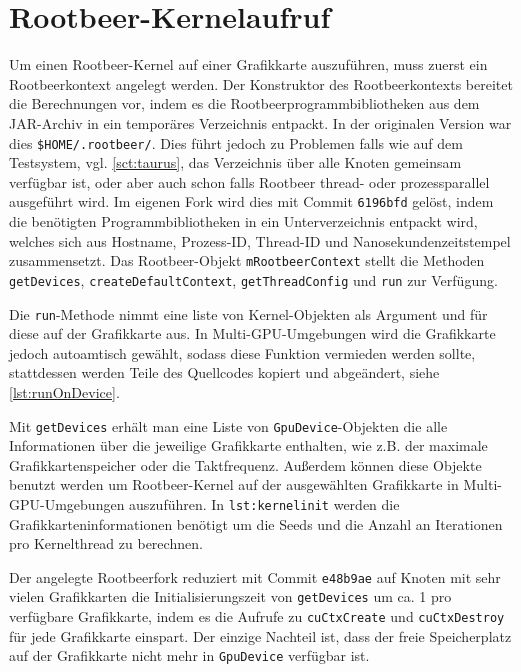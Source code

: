 \section{Rootbeer-Kernelaufruf}

Um einen Rootbeer-Kernel auf einer Grafikkarte auszuführen, muss zuerst ein Rootbeerkontext angelegt werden.
Der Konstruktor des Rootbeerkontexts bereitet die Berechnungen vor, indem es die Rootbeerprogrammbibliotheken aus dem JAR-Archiv in ein temporäres Verzeichnis entpackt. In der originalen Version war dies \lstinline!$HOME/.rootbeer/!.
Dies führt jedoch zu Problemen falls wie auf dem Testsystem, vgl. \autoref{sct:taurus}, das Verzeichnis über alle Knoten gemeinsam verfügbar ist, oder aber auch schon falls Rootbeer thread- oder prozessparallel ausgeführt wird.
Im eigenen Fork \cite{ownrootbeerfork} wird dies mit Commit \lstinline!6196bfd! gelöst, indem die benötigten Programmbibliotheken in ein Unterverzeichnis entpackt wird, welches sich aus Hostname, Prozess-ID, Thread-ID und Nanosekundenzeitstempel zusammensetzt.
Das Rootbeer-Objekt \lstinline!mRootbeerContext! stellt die Methoden \lstinline!getDevices!, \lstinline!createDefaultContext!, \lstinline!getThreadConfig! und \lstinline!run! zur Verfügung.

Die \lstinline!run!-Methode nimmt eine liste von Kernel-Objekten als Argument und für diese auf der Grafikkarte aus. In Multi-GPU-Umgebungen wird die Grafikkarte jedoch autoamtisch gewählt, sodass diese Funktion vermieden werden sollte, stattdessen werden Teile des Quellcodes kopiert und abgeändert, siehe \autoref{lst:runOnDevice}.

Mit \lstinline!getDevices! erhält man eine Liste von \lstinline!GpuDevice!-Objekten die alle Informationen über die jeweilige Grafikkarte enthalten, wie z.B. der maximale Grafikkartenspeicher oder die Taktfrequenz. Außerdem können diese Objekte benutzt werden um Rootbeer-Kernel auf der ausgewählten Grafikkarte in Multi-GPU-Umgebungen auszuführen. In \lstinline!lst:kernelinit! werden die Grafikkarteninformationen benötigt um die Seeds und die Anzahl an Iterationen pro Kernelthread zu berechnen.

Der angelegte Rootbeerfork \cite{ownrootbeerfork} reduziert mit Commit \lstinline!e48b9ae! auf Knoten mit sehr vielen Grafikkarten die Initialisierungszeit von \lstinline!getDevices! um ca. \SI{1}{\seconds} pro verfügbare Grafikkarte, indem es die Aufrufe zu \lstinline!cuCtxCreate! und \lstinline!cuCtxDestroy! für jede Grafikkarte einspart. Der einzige Nachteil ist, dass der freie Speicherplatz auf der Grafikkarte nicht mehr in \lstinline!GpuDevice! verfügbar ist.

